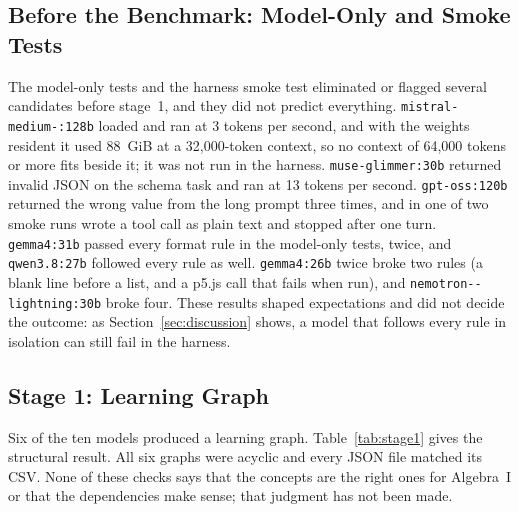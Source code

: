 \documentclass[11pt]{article}
\newcommand{\mdl}[1]{\texttt{#1}}
\newcommand{\Qeight}{\mdl{qwen3.8:27b}}
\newcommand{\Gthirtyone}{\mdl{gemma4:31b}}
\newcommand{\Muse}{\mdl{muse-\allowbreak glimmer:30b}}
\newcommand{\Gtwentysix}{\mdl{gemma4:26b}}
\newcommand{\Nemo}{\mdl{nemotron-\allowbreak 3.5-\allowbreak lightning:30b}}
\newcommand{\Mistral}{\mdl{mistral-\allowbreak medium-\allowbreak 3.5:128b}}
\newcommand{\Gptoss}{\mdl{gpt-oss:120b}}
\begin{document}
\subsection{Before the Benchmark: Model-Only and Smoke Tests}

The model-only tests and the harness smoke test eliminated or flagged several candidates before stage~1, and they did not predict everything. \Mistral{} loaded and ran at 3 tokens per second, and with the weights resident it used 88~GiB at a 32,000-token context, so no context of 64,000 tokens or more fits beside it; it was not run in the harness. \Muse{} returned invalid JSON on the schema task and ran at 13 tokens per second. \Gptoss{} returned the wrong value from the long prompt three times, and in one of two smoke runs wrote a tool call as plain text and stopped after one turn. \Gthirtyone{} passed every format rule in the model-only tests, twice, and \Qeight{} followed every rule as well. \Gtwentysix{} twice broke two rules (a blank line before a list, and a p5.js call that fails when run), and \Nemo{} broke four. These results shaped expectations and did not decide the outcome: as Section~\ref{sec:discussion} shows, a model that follows every rule in isolation can still fail in the harness.

\subsection{Stage 1: Learning Graph}

Six of the ten models produced a learning graph. Table~\ref{tab:stage1} gives the structural result. All six graphs were acyclic and every JSON file matched its CSV. None of these checks says that the concepts are the right ones for Algebra~I or that the dependencies make sense; that judgment has not been made.
\end{document}
